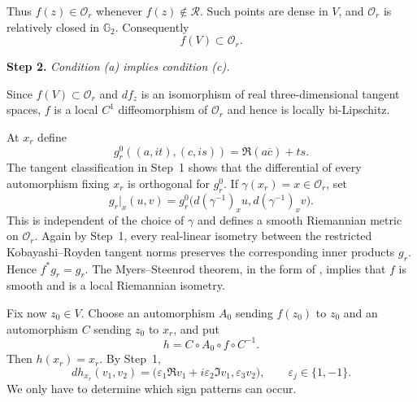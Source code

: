 \documentclass[12pt]{amsart}
\newcommand{\GG}{\mathbb G_2}
\newcommand{\cR}{\mathcal R}
\begin{document}
Thus $f(z)\in\mathcal O_r$ whenever $f(z)\notin\cR$. Such points
are dense in $V$, and $\mathcal O_r$ is relatively closed in $\GG$.
Consequently
\[
 f(V)\subset\mathcal O_r.
\]

\medskip

\noindent
\textbf{Step 2.}
\emph{Condition \textup{(a)} implies condition \textup{(c)}.}

\medskip

Since $f(V)\subset\mathcal O_r$ and $df_z$ is an isomorphism of real
three-dimensional tangent spaces, $f$ is a local $C^1$ diffeomorphism of
$\mathcal O_r$ and hence is locally bi-Lipschitz.

At $x_r$ define
\[
 g_r^0((a,it),(c,is))=\Re(a\overline c)+ts.
\]
The tangent classification in Step~1 shows that the differential of every
automorphism fixing $x_r$ is orthogonal for $g_r^0$. If
$\gamma(x_r)=x\in\mathcal O_r$, set
\[
 g_r|_x(u,v)=g_r^0\bigl(d(\gamma^{-1})_xu,d(\gamma^{-1})_xv\bigr).
\]
This is independent of the choice of $\gamma$ and defines a smooth
Riemannian metric on $\mathcal O_r$. Again by Step~1, every real-linear
isometry between the restricted Kobayashi--Royden tangent norms preserves the
corresponding inner products $g_r$. Hence $f^*g_r=g_r$. The
Myers--Steenrod theorem, in the form of
\cite[Theorem~2.2]{MatveevTroyanov2017}, implies that $f$ is smooth and is a
local Riemannian isometry.

Fix now $z_0\in V$. Choose an automorphism $A_0$ sending
$f(z_0)$ to $z_0$ and an automorphism $C$ sending
$z_0$ to $x_r$, and put
\[
 h=C\circ A_0\circ f\circ C^{-1}.
\]
Then $h(x_r)=x_r$. By Step~1,
\[
 dh_{x_r}(v_1,v_2)=
 \bigl(\varepsilon_1\Re v_1+i\varepsilon_2\Im v_1,
       \varepsilon_3v_2\bigr),
 \qquad \varepsilon_j\in\{1,-1\}.
\]
We only have to determine which sign patterns can occur.
\end{document}
